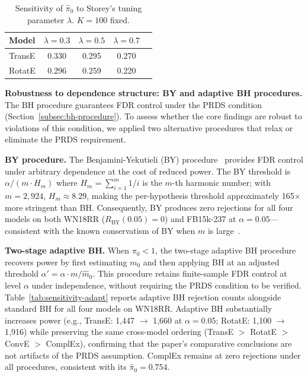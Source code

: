 \begin{table}[h]
\centering
\caption{Sensitivity of $\hat{\pi}_0$ to Storey's tuning parameter $\lambda$. $K=100$ fixed.}
\label{tab:sensitivity-lambda}
\begin{tabular}{lcccc}
\toprule
\textbf{Model} & \textbf{$\lambda=0.3$} & \textbf{$\lambda=0.5$} & \textbf{$\lambda=0.7$} \\
\midrule
TransE & 0.330 & 0.295 & 0.270 \\
RotatE & 0.296 & 0.259 & 0.220 \\
\bottomrule
\end{tabular}
\end{table}

\textbf{Robustness to dependence structure: BY and adaptive BH procedures.}
The BH procedure guarantees FDR control under the PRDS condition (Section~\ref{subsec:bh-procedure}). To assess whether the core findings are robust to violations of this condition, we applied two alternative procedures that relax or eliminate the PRDS requirement.

\textbf{BY procedure.}
The Benjamini-Yekutieli (BY) procedure~\cite{benjamini2001control} provides FDR control under arbitrary dependence at the cost of reduced power.
The BY threshold is $\alpha / (m \cdot H_m)$ where $H_m = \sum_{i=1}^m 1/i$ is the $m$-th harmonic number; with $m = 2{,}924$, $H_m \approx 8.29$, making the per-hypothesis threshold approximately 165$\times$ more stringent than BH.
Consequently, BY produces zero rejections for all four models on both WN18RR ($R_{\text{BY}}(0.05) = 0$) and FB15k-237 at $\alpha = 0.05$---consistent with the known conservatism of BY when $m$ is large~\cite{benjamini2001control}.

\textbf{Two-stage adaptive BH.}
When $\pi_0 < 1$, the two-stage adaptive BH procedure~\cite{benjamini2006adaptive} recovers power by first estimating $m_0$ and then applying BH at an adjusted threshold $\alpha' = \alpha \cdot m / \hat{m}_0$.
This procedure retains finite-sample FDR control at level $\alpha$ under independence, without requiring the PRDS condition to be verified.
Table~\ref{tab:sensitivity-adapt} reports adaptive BH rejection counts alongside standard BH for all four models on WN18RR.
Adaptive BH substantially increases power (e.g., TransE: 1{,}447 $\to$ 1{,}660 at $\alpha = 0.05$; RotatE: 1{,}100 $\to$ 1{,}916) while preserving the same cross-model ordering (TransE $>$ RotatE $>$ ConvE $>$ ComplEx), confirming that the paper's comparative conclusions are not artifacts of the PRDS assumption.
ComplEx remains at zero rejections under all procedures, consistent with its $\hat{\pi}_0 = 0.754$.

